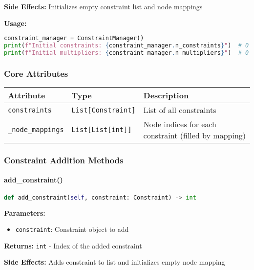 \textbf{Side Effects:} Initializes empty constraint list and node mappings

\textbf{Usage:}
\begin{lstlisting}[language=Python, caption=ConstraintManager Constructor Usage]
constraint_manager = ConstraintManager()
print(f"Initial constraints: {constraint_manager.n_constraints}")  # 0
print(f"Initial multipliers: {constraint_manager.n_multipliers}")  # 0
\end{lstlisting}

\subsubsection{Core Attributes}

\begin{longtable}{|p{3.5cm}|p{2.5cm}|p{7cm}|}
\hline
\textbf{Attribute} & \textbf{Type} & \textbf{Description} \\
\hline
\endhead

\texttt{constraints} & \texttt{List[Constraint]} & List of all constraints \\
\hline

\texttt{\_node\_mappings} & \texttt{List[List[int]]} & Node indices for each constraint (filled by mapping) \\
\hline

\end{longtable}

\subsubsection{Constraint Addition Methods}

\paragraph{add\_constraint()}\leavevmode
\begin{lstlisting}[language=Python, caption=Add Constraint Method]
def add_constraint(self, constraint: Constraint) -> int
\end{lstlisting}

\textbf{Parameters:}
\begin{itemize}
    \item \texttt{constraint}: Constraint object to add
\end{itemize}

\textbf{Returns:} \texttt{int} - Index of the added constraint

\textbf{Side Effects:} Adds constraint to list and initializes empty node mapping

